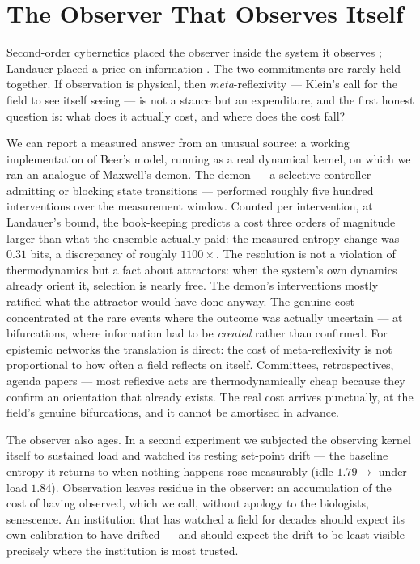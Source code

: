 \documentclass[12pt]{article}
\begin{document}
\section{The Observer That Observes Itself}
\label{sec:observer}


Second-order cybernetics placed the observer inside the system it observes
\citep{vonFoerster2003,Maturana1980}; Landauer placed a price on information
\citep{Landauer1961}. The two commitments are rarely held together. If
observation is physical, then \emph{meta}-reflexivity --- Klein's call for the
field to see itself seeing --- is not a stance but an expenditure, and the
first honest question is: what does it actually cost, and where does the cost
fall?

We can report a measured answer from an unusual source: a working
implementation of Beer's model, running as a real dynamical kernel, on which we
ran an analogue of Maxwell's demon. The demon --- a selective controller
admitting or blocking state transitions --- performed roughly five hundred
interventions over the measurement window. Counted per intervention, at
Landauer's bound, the book-keeping predicts a cost three orders of magnitude
larger than what the ensemble actually paid: the measured entropy change was
$0.31$ bits, a discrepancy of roughly $1100\times$. The resolution is not a
violation of thermodynamics but a fact about attractors: when the system's own
dynamics already orient it, selection is nearly free. The demon's interventions
mostly ratified what the attractor would have done anyway. The genuine cost
concentrated at the rare events where the outcome was actually uncertain ---
at bifurcations, where information had to be \emph{created} rather than
confirmed. For epistemic networks the translation is direct: the cost of
meta-reflexivity is not proportional to how often a field reflects on itself.
Committees, retrospectives, agenda papers --- most reflexive acts are
thermodynamically cheap because they confirm an orientation that already
exists. The real cost arrives punctually, at the field's genuine
bifurcations, and it cannot be amortised in advance.

The observer also ages. In a second experiment we subjected the observing
kernel itself to sustained load and watched its resting set-point drift ---
the baseline entropy it returns to when nothing happens rose measurably
(idle $1.79 \rightarrow$ under load $1.84$). Observation leaves residue in
the observer: an accumulation of the cost of having observed, which we call,
without apology to the biologists, senescence. An institution that has
watched a field for decades should expect its own calibration to have
drifted --- and should expect the drift to be least visible precisely where
the institution is most trusted.
\end{document}
